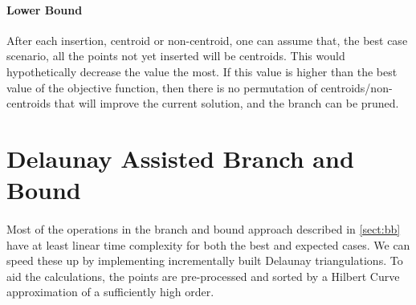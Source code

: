 \paragraph{Lower Bound}
After each insertion, centroid or non-centroid, one can assume that, the best case scenario, all the points not yet inserted will be centroids. This would hypothetically decrease the value the most. If this value is higher than the best value of the objective function, then there is no permutation of centroids/non-centroids that will improve the current solution, and the branch can be pruned.
\paragraph{}
\section{Delaunay Assisted Branch and Bound}
\paragraph{}
Most of the operations in the branch and bound approach described in \ref{sect:bb} have at least linear time complexity for both the best and expected cases. We can speed these up by implementing incrementally built Delaunay triangulations. To aid the calculations, the points are pre-processed and sorted by a Hilbert Curve approximation of a sufficiently high order.

